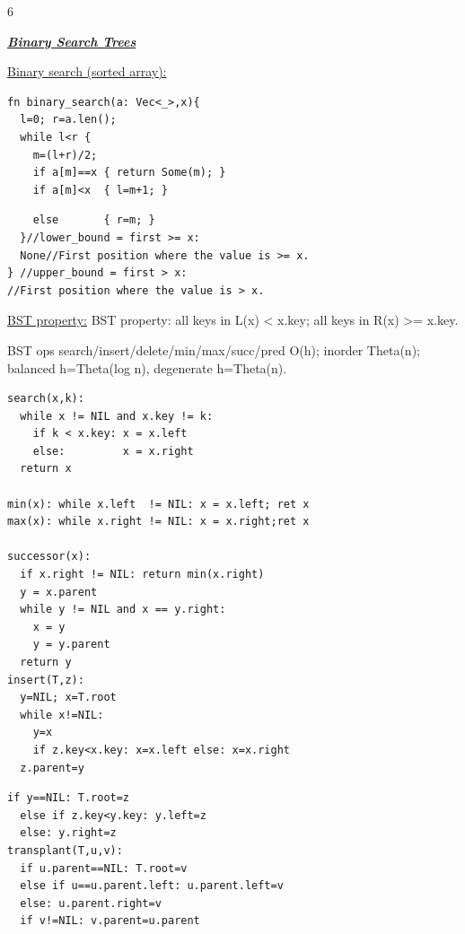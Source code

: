 \documentclass[a4paper,landscape]{article}
\renewcommand{\textbf}[1]{\underline{#1}}
\newcommand{\subsectionsize}{\fontsize{3.92}{4.02}\selectfont}
\newcommand{\subsectiontitle}[1]{%
  \par\vspace{0pt}%
  {\subsectionsize\bfseries\itshape\textbf{#1}}\par%
  \vspace{0pt}%
}
\begin{document}
\begin{multicols*}{6}
\subsectiontitle{Binary Search Trees}
\textbf{Binary search (sorted array):}\\
\begin{minipage}[t]{0.49\linewidth}\vspace{0pt}
\begin{lstlisting}
fn binary_search(a: Vec<_>,x){
  l=0; r=a.len();
  while l<r {
    m=(l+r)/2;
    if a[m]==x { return Some(m); }
    if a[m]<x  { l=m+1; }
\end{lstlisting}
\end{minipage}\hfill
\begin{minipage}[t]{0.49\linewidth}\vspace{0pt}
\begin{lstlisting}
    else       { r=m; }
  }//lower_bound = first >= x: 
  None//First position where the value is >= x.
} //upper_bound = first > x: 
//First position where the value is > x.
\end{lstlisting}
\end{minipage}
\textbf{BST property:}
BST property: all keys in L(x) < x.key; all keys in R(x) >= x.key.

BST ops search/insert/delete/min/max/succ/pred O(h); inorder Theta(n); balanced h=Theta(log n), degenerate h=Theta(n).

\noindent
\begin{minipage}[t]{0.49\linewidth}\vspace{0pt}
\begin{lstlisting}[aboveskip=0pt,belowskip=0pt]
search(x,k):
  while x != NIL and x.key != k:
    if k < x.key: x = x.left
    else:         x = x.right
  return x

min(x): while x.left  != NIL: x = x.left; ret x
max(x): while x.right != NIL: x = x.right;ret x

successor(x):
  if x.right != NIL: return min(x.right)
  y = x.parent
  while y != NIL and x == y.right:
    x = y
    y = y.parent
  return y
insert(T,z):
  y=NIL; x=T.root
  while x!=NIL:
    y=x
    if z.key<x.key: x=x.left else: x=x.right
  z.parent=y
\end{lstlisting}
\end{minipage}\hfill
\begin{minipage}[t]{0.49\linewidth}\vspace{0pt}
\begin{lstlisting}[aboveskip=0pt,belowskip=0pt]
  if y==NIL: T.root=z
  else if z.key<y.key: y.left=z
  else: y.right=z
transplant(T,u,v):
  if u.parent==NIL: T.root=v
  else if u==u.parent.left: u.parent.left=v
  else: u.parent.right=v
  if v!=NIL: v.parent=u.parent


\end{lstlisting}
\end{minipage}
\end{multicols*}
\end{document}
